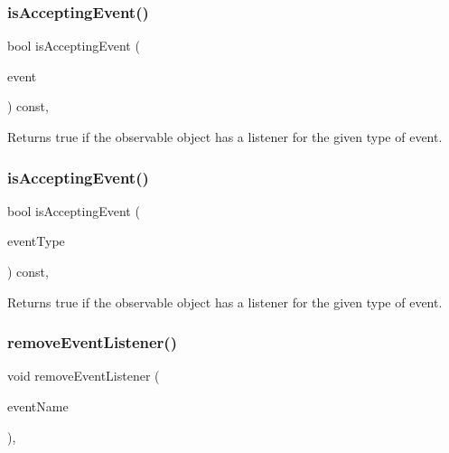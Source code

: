 \subsubsection{\texorpdfstring{is\+Accepting\+Event()}{isAcceptingEvent()}\hspace{0.1cm}{\footnotesize\ttfamily [2/3]}}
{\footnotesize\ttfamily bool is\+Accepting\+Event (\begin{DoxyParamCaption}\item[{const \mbox{\hyperlink{classsgl_1_1GEvent}{G\+Event}} \&}]{event }\end{DoxyParamCaption}) const\hspace{0.3cm}{\ttfamily [protected]}, {\ttfamily [virtual]}}



Returns true if the observable object has a listener for the given type of event. 

\mbox{\label{classsgl_1_1GObservable_a3b1c689267eda44e65a2213e7de38b23}} 
\subsubsection{\texorpdfstring{is\+Accepting\+Event()}{isAcceptingEvent()}\hspace{0.1cm}{\footnotesize\ttfamily [3/3]}}
{\footnotesize\ttfamily bool is\+Accepting\+Event (\begin{DoxyParamCaption}\item[{const std\+::string \&}]{event\+Type }\end{DoxyParamCaption}) const\hspace{0.3cm}{\ttfamily [protected]}, {\ttfamily [virtual]}}



Returns true if the observable object has a listener for the given type of event. 

\mbox{\label{classsgl_1_1GObservable_acbcf1ed3a851ad8a3c17ef38d86b481d}} 
\subsubsection{\texorpdfstring{remove\+Event\+Listener()}{removeEventListener()}}
{\footnotesize\ttfamily void remove\+Event\+Listener (\begin{DoxyParamCaption}\item[{const std\+::string \&}]{event\+Name }\end{DoxyParamCaption})\hspace{0.3cm}{\ttfamily [protected]}, {\ttfamily [virtual]}}



